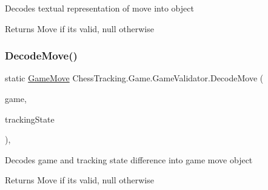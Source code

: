 Decodes textual representation of move into object 

\begin{DoxyReturn}{Returns}
Move if it\textquotesingle{}s valid, null otherwise
\end{DoxyReturn}
\mbox{\label{class_chess_tracking_1_1_game_1_1_game_validator_ae8a8e271e382bb27e307a8ccd6f2d3af}} 
\subsubsection{\texorpdfstring{DecodeMove()}{DecodeMove()}\hspace{0.1cm}{\footnotesize\ttfamily [2/2]}}
{\footnotesize\ttfamily static \mbox{\hyperlink{class_chess_tracking_1_1_game_1_1_game_move}{Game\+Move}} Chess\+Tracking.\+Game.\+Game\+Validator.\+Decode\+Move (\begin{DoxyParamCaption}\item[{\mbox{\hyperlink{class_chess_tracking_1_1_game_1_1_game_data}{Game\+Data}}}]{game,  }\item[{\mbox{\hyperlink{class_chess_tracking_1_1_multithreading_messages_1_1_tracking_state}{Tracking\+State}}}]{tracking\+State }\end{DoxyParamCaption})\hspace{0.3cm}{\ttfamily [static]}, {\ttfamily [private]}}



Decodes game and tracking state difference into game move object 

\begin{DoxyReturn}{Returns}
Move if it\textquotesingle{}s valid, null otherwise
\end{DoxyReturn}
\mbox{\label{class_chess_tracking_1_1_game_1_1_game_validator_ac398b44f0918461ab68a70f117c8d45b}} 
